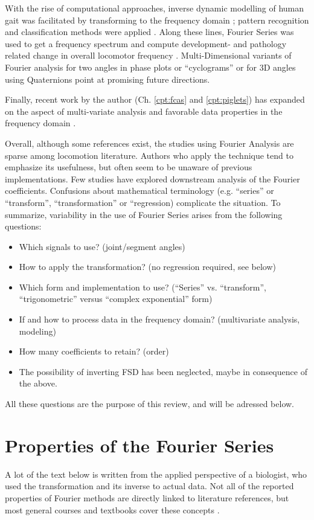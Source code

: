 With the rise of computational approaches, inverse dynamic modelling of human gait was facilitated by transforming to the frequency domain \citep{Ren2007}; pattern recognition and classification methods were applied \citep[e.g.][]{Mostayed2008}.
Along these lines, Fourier Series was used to get a frequency spectrum and compute development- and pathology related change in overall locomotor frequency \citep[e.g.][]{Kurz2011}.
Multi-Dimensional variants of Fourier analysis for two angles in phase plots or ``cyclograms'' \citep{DiBerardinoIII2010} or for 3D angles using Quaternions \citep{Kenwright2015} point at promising future directions.


Finally, recent work by the author (Ch. \ref{cpt:fcas} and \ref{cpt:piglets}) has expanded on the aspect of multi-variate analysis and favorable data properties in the frequency domain \citep{Mielke2019,Mielke2023}.



Overall, although some references exist, the studies using Fourier Analysis are sparse among locomotion literature.
Authors who apply the technique tend to emphasize its usefulness, but often seem to be unaware of previous implementations.
Few studies have explored downstream analysis of the Fourier coefficients.
Confusions about mathematical terminology (e.g. ``series'' or ``transform'', ``transformation'' or ``regression) complicate the situation.
To summarize, variability in the use of Fourier Series arises from the following questions:
\begin{itemize}
\item Which signals to use? (joint/segment angles)
\item How to apply the transformation? (no regression required, see below)
\item Which form and implementation to use? (``Series'' vs. ``transform'', ``trigonometric'' versus ``complex exponential'' form)
\item If and how to process data in the frequency domain? (multivariate analysis, modeling)
\item How many coefficients to retain? (order)
\item The possibility of inverting FSD has been neglected, maybe in consequence of the above.
\end{itemize}

All these questions are the purpose of this review, and will be adressed below.

\FloatBarrier\clearpage
\section{Properties of the Fourier Series}
\label{properties}
A lot of the text below is written from the applied perspective of a biologist, who used the transformation and its inverse to actual data.
Not all of the reported properties of Fourier methods are directly linked to literature references, but most general courses and textbooks cover these concepts \citep[e.g.][]{Bracewell2000,Osgood2007,Osgood2019}.


